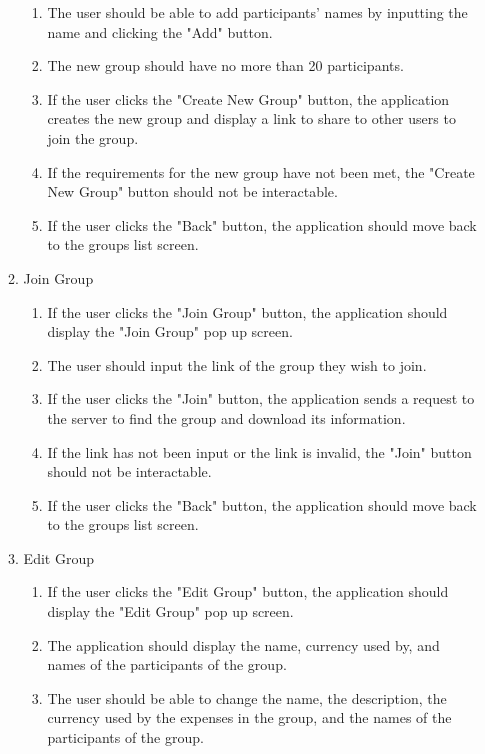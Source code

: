 \documentclass[conference]{IEEEtran}
\begin{document}
\begin{enumerate}
\begin{enumerate}
\begin{enumerate}
                        \item The user should be able to add participants' names by inputting the name and clicking the "Add" button.
                        \item The new group should have no more than 20 participants.
                        \item If the user clicks the "Create New Group" button, the application creates the new group and display a link to share to other users to join the group.
                        \item If the requirements for the new group have not been met, the "Create New Group" button should not be interactable.
                        \item If the user clicks the "Back" button, the application should move back to the groups list screen.
                    \end{enumerate}
                \item Join Group
                    \begin{enumerate}
                        \item If the user clicks the "Join Group" button, the application should display the "Join Group" pop up screen.
                        \item The user should input the link of the group they wish to join.
                        \item If the user clicks the "Join" button, the application sends a request to the server to find the group and download its information.
                        \item If the link has not been input or the link is invalid, the "Join" button should not be interactable.
                        \item If the user clicks the "Back" button, the application should move back to the groups list screen.
                    \end{enumerate}
                \item Edit Group
                    \begin{enumerate}
                        \item If the user clicks the "Edit Group" button, the application should display the "Edit Group" pop up screen.
                        \item The application should display the name, currency used by, and names of the participants of the group.
                        \item The user should be able to change the name, the description, the currency used by the expenses in the group, and the names of the participants of the group.

\end{enumerate}
\end{enumerate}
\end{enumerate}
\end{document}
